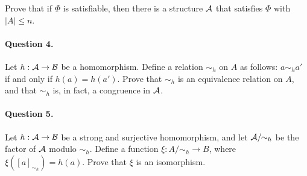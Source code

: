 \documentclass[11pt, a4paper]{article}
\begin{document}
Prove that if $\Phi$ is satisfiable, then there is a structure $\mathcal{A}$ that satisfies $\Phi$ with $|A|\leq n$. 


\paragraph*{Question 4.}
Let $h:\mathcal{A} \to \mathcal{B}$ be a homomorphism.
Define a relation $\sim_h$ on $A$ as follows:
$a \sim_h a'$ if and only if $h(a)=h(a')$.
Prove that $\sim_h$ is an equivalence relation on $A$,
and that $\sim_h$ is, in fact, a congruence in $\mathcal{A}$.

\paragraph*{Question 5.}
Let $h:\mathcal{A}\to\mathcal{B}$ be a strong and surjective homomorphism,
and let $\mathcal{A}/\!\!\sim_h$ be the factor of $\mathcal{A}$ modulo $\sim_h$.
Define a function $\xi:A/\!\!\sim_h \to B$,
where $\xi([a]_{\sim_h}) = h(a)$.
Prove that $\xi$ is an isomorphism.
\end{document}
